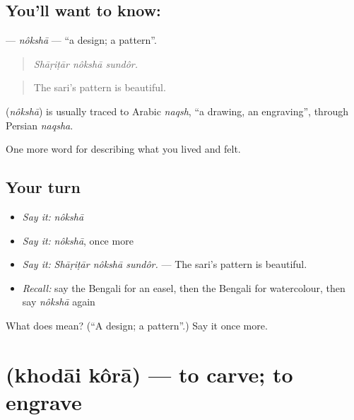 \subsection*{You'll want to know: }
\textbf{} — \emph{nôkshā} — \textquotedblleft{}a design; a pattern\textquotedblright{}.

\begin{quote}
  
\end{quote}

\begin{quote}
\emph{Shāṛiṭār nôkshā sundôr.}
\end{quote}

\begin{quote}
The sari's pattern is beautiful.
\end{quote}

\begin{cousinweb}
\textbf{} (\emph{nôkshā}) is usually traced to Arabic \emph{naqsh}, \textquotedblleft{}a drawing, an engraving\textquotedblright{}, through Persian \emph{naqsha}.
\end{cousinweb}

\begin{grammarlens}[title={What you've built}]
One more word for describing what you lived and felt.
\end{grammarlens}

\subsection*{Your turn}
\begin{itemize}
\raggedright
  \item \emph{Say it:} \emph{nôkshā}
  \item \emph{Say it:} \emph{nôkshā}, once more
  \item \emph{Say it:} \emph{Shāṛiṭār nôkshā sundôr.} — The sari's pattern is beautiful.
  \item \emph{Recall:} say the Bengali for an easel, then the Bengali for watercolour, then say \emph{nôkshā} again
\end{itemize}

\begin{tcolorbox}[breakable,colback=teal!4,colframe=teal!35!black,title={Before you move on}]
What does  mean? (\textquotedblleft{}A design; a pattern\textquotedblright{}.) Say it once more.
\end{tcolorbox}
\section[\texorpdfstring{\bn{খোদাই} \bn{করা} (khodāi kôrā)}{খোদাই করা (khodāi kôrā)}]{  (khodāi kôrā) — to carve; to engrave}

